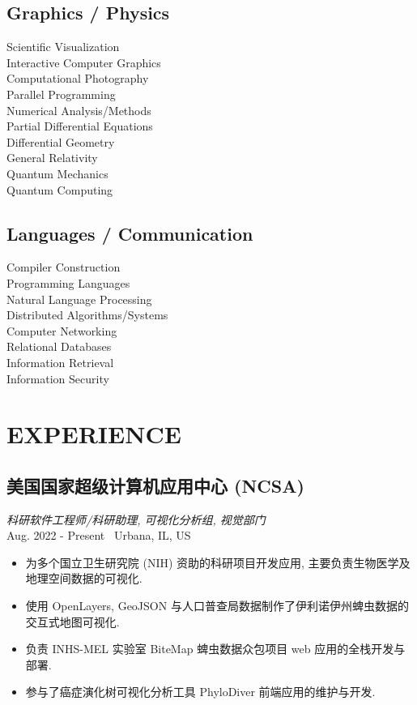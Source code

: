 \documentclass[11pt,twocolumn]{article}
\begin{document}
\subsection*{{Graphics / Physics}}
Scientific Visualization\\
Interactive Computer Graphics\\
Computational Photography\\
Parallel Programming\\
Numerical Analysis/Methods\\
Partial Differential Equations\\
Differential Geometry\\
General Relativity\\
Quantum Mechanics\\
Quantum Computing\\

\subsection*{{Languages / Communication}}
Compiler Construction\\
Programming Languages\\
Natural Language Processing\\
Distributed Algorithms/Systems\\
Computer Networking\\
Relational Databases\\
Information Retrieval\\
Information Security\\


\newpage

\section*{\textnormal{EXPERIENCE}}

\subsection*{美国国家超级计算机应用中心 (NCSA)}
\textit{科研软件工程师/科研助理, 可视化分析组, 视觉部门}\\
Aug. 2022 - Present \textbullet\ Urbana, IL, US
\begin{itemize}
\item 为多个国立卫生研究院 (NIH) 资助的科研项目开发应用, 主要负责生物医学及地理空间数据的可视化.
\item 使用 OpenLayers, GeoJSON 与人口普查局数据制作了伊利诺伊州蜱虫数据的交互式地图可视化.
\item 负责 INHS-MEL 实验室 BiteMap 蜱虫数据众包项目 web 应用的全栈开发与部署.
\item 参与了癌症演化树可视化分析工具 PhyloDiver 前端应用的维护与开发.
\end{itemize}
\end{document}

